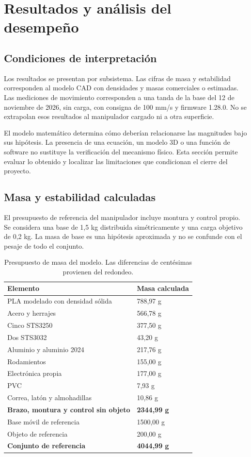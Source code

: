 \chapter{Resultados y análisis del desempeño}
\label{cap:resultados}

\section{Condiciones de interpretación}
Los resultados se presentan por subsistema. Las cifras de masa y estabilidad corresponden al modelo CAD con densidades y masas comerciales o estimadas. Las mediciones de movimiento corresponden a una tanda de la base del 12 de noviembre de 2026, sin carga, con consigna de 100 mm/s y firmware 1.28.0. No se extrapolan esos resultados al manipulador cargado ni a otra superficie.

El modelo matemático determina cómo deberían relacionarse las magnitudes bajo sus hipótesis. La presencia de una ecuación, un modelo 3D o una función de software no sustituye la verificación del mecanismo físico. Esta sección permite evaluar lo obtenido y localizar las limitaciones que condicionan el cierre del proyecto.

\section{Masa y estabilidad calculadas}
El presupuesto de referencia del manipulador incluye montura y control propio. Se considera una base de 1,5 kg distribuida simétricamente y una carga objetivo de 0,2 kg. La masa de base es una hipótesis aproximada y no se confunde con el pesaje de todo el conjunto.

\begin{table}[!htbp]\centering\small
\caption{Presupuesto de masa del modelo. Las diferencias de centésimas provienen del redondeo.}
\begin{tabularx}{\linewidth}{@{}YP{32mm}@{}}
\toprule\textbf{Elemento} & \textbf{Masa calculada}\\\midrule
PLA modelado con densidad sólida & 788,97 g\\
Acero y herrajes & 566,78 g\\
Cinco STS3250 & 377,50 g\\
Dos STS3032 & 43,20 g\\
Aluminio y aluminio 2024 & 217,76 g\\
Rodamientos & 155,00 g\\
Electrónica propia & 177,00 g\\
PVC & 7,93 g\\
Correa, latón y almohadillas & 10,86 g\\\midrule
\textbf{Brazo, montura y control sin objeto} & \textbf{2344,99 g}\\
Base móvil de referencia & 1500,00 g\\
Objeto de referencia & 200,00 g\\\midrule
\textbf{Conjunto de referencia} & \textbf{4044,99 g}\\\bottomrule
\end{tabularx}
\end{table}

